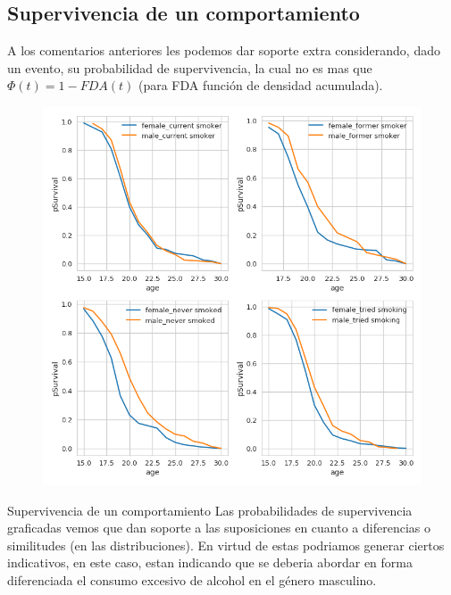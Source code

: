 \documentclass[8pt]{beamer}
\begin{document}
\subsection{Supervivencia de un comportamiento}
\begin{frame}
A los comentarios anteriores les podemos dar soporte extra considerando, dado un evento, su probabilidad de supervivencia, la cual 
no es mas que $\Phi(t)=1-FDA(t)$  (para FDA función de densidad acumulada).

\setlength{\columnsep}{60pt} 
\begin{multicols}{2} 
\begin{minipage}[t]{.6\textwidth}
\begin{figure}
 \includegraphics[scale=0.25]{smoking_survival}
 \end{figure}
\end{minipage}
\begin{minipage}[t]{.4\textwidth}
\pause
\centering
\small{
\begin{block}{Supervivencia de un comportamiento}
Las probabilidades de supervivencia graficadas vemos que dan soporte a las suposiciones en cuanto a diferencias o similitudes (en las distribuciones). En virtud de estas podriamos generar ciertos indicativos, en este caso, estan indicando que se deberia abordar en forma diferenciada el consumo excesivo de alcohol en el género masculino.
\end{block}
}
\end{minipage} 
\end{multicols}
\end{frame}
\end{document}
